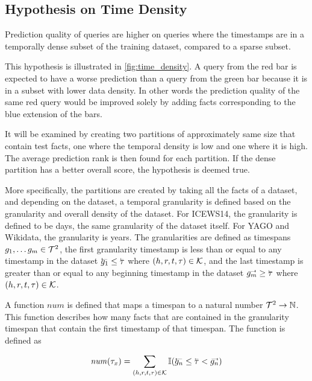 \subsection{Hypothesis on Time Density}
\label{sec:hypothesis_time_density}

\begin{hypothesis}
\label{hyp:time_density}
Prediction quality of queries are higher on queries where the timestamps are in a temporally dense subset of the training dataset, compared to a sparse subset.
\end{hypothesis}



This hypothesis is illustrated in \autoref{fig:time_density}. A query from the red bar is expected to have a worse prediction than a query from the green bar because it is in a subset with lower data density. In other words the prediction quality of the same red query would be improved solely by adding facts corresponding to the blue extension of the bars.

It will be examined by creating two partitions of approximately same size that contain test facts, one where the temporal density is low and one where it is high. The average prediction rank is then found for each partition. If the dense partition has a better overall score, the hypothesis is deemed true.

More specifically, the partitions are created by taking all the facts of a dataset, and depending on the dataset, a temporal granularity is defined based on the granularity and overall density of the dataset. For ICEWS14, the granularity is defined to be days, the same granularity of the dataset itself. For YAGO and Wikidata, the granularity is years. The granularities are defined as timespans $g_1, \dots g_m \in \mathcal{T}^2$, the first granularity timestamp is less than or equal to any timestamp in the dataset $\timebegin{g_1} \leq \timebegin{\tau}$ where $(h, r, t, \tau) \in \mathcal{K}$, and the last timestamp is greater than or equal to any beginning timestamp in the dataset $\timeend{g_m} \geq \timebegin{\tau}$ where $(h, r, t, \tau) \in \mathcal{K}$.

A function $\mathit{num}$ is defined that maps a timespan to a natural number $\mathcal{T}^2 \rightarrow \mathbb{N}$. This function describes how many facts that are contained in the granularity timespan that contain the first timestamp of that timespan. The function is defined as

\begin{equation}
\mathit{num}(\tau_x) = \varsum_{(h, r, t, \tau) \in \varK} \I ( \timebegin{g_n} \leq \timebegin{\tau} < \timeend{g_n} )
\end{equation}

